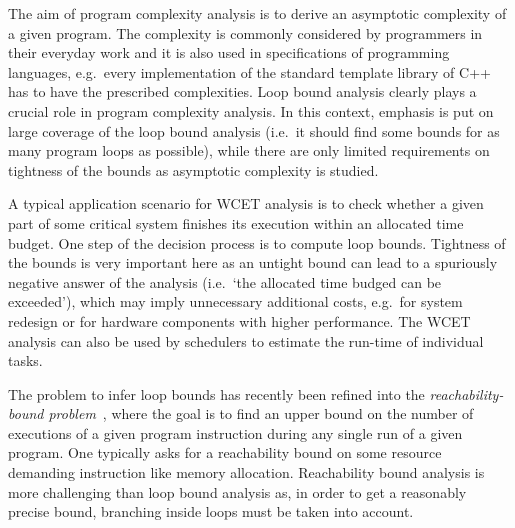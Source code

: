 \documentclass[10pt,a4paper]{article}
\begin{document}
The aim of program complexity analysis is to derive an asymptotic complexity of
a given program. The complexity is commonly considered by programmers in their
everyday work and it is also used in specifications of programming languages,
e.g.~every implementation of the standard template library of C++ has to have
the prescribed complexities. Loop bound analysis clearly plays a crucial role in
program complexity analysis. In this context, emphasis is put on large coverage
of the loop bound analysis (i.e.~it should find some bounds for as many program
loops as possible), while there are only limited requirements on tightness of
the bounds as asymptotic complexity is studied.


A typical application scenario for WCET analysis is to check whether a
given part of some critical system finishes its execution within an
allocated time budget.  One step of the decision process is to compute
loop bounds. Tightness of the bounds is very important here as an
untight bound can lead to a spuriously negative answer of the analysis
(i.e.~`the allocated time budged can be exceeded'), which may imply
unnecessary additional costs, e.g.~for system redesign or for hardware
components with higher performance.
The WCET analysis can also be used by schedulers to estimate the
run-time of individual tasks.



The problem to infer loop bounds has recently been refined into the
\emph{reachability-bound problem}~\cite{SPEED2010}, where the goal is
to find an upper bound on the number of executions of a given program
instruction during any single run of a given program. One typically
asks for a reachability bound on some resource demanding instruction
like memory allocation. Reachability bound analysis is more
challenging than loop bound analysis as, in order to get a reasonably
precise bound, branching inside loops must be taken into account.
\end{document}
